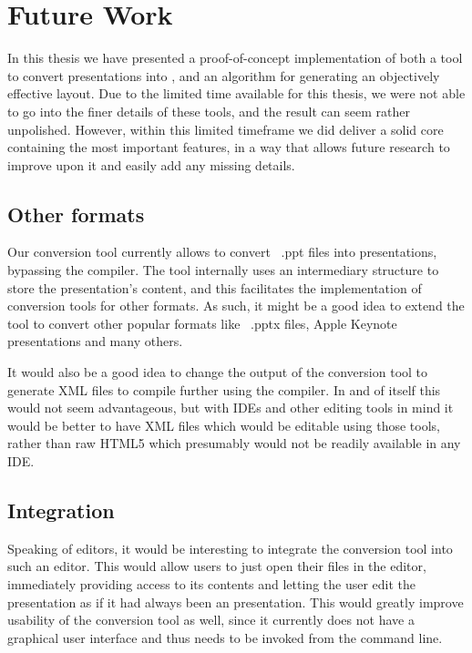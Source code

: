   \section{Future Work}
   \label{future}

   In this thesis we have presented a proof-of-concept implementation of both a
   tool to convert \ppt presentations into \mxp, and an algorithm for
   generating an objectively effective layout. Due to the limited time
   available for this thesis, we were not able to go into the finer details of
   these tools, and the result can seem rather unpolished. However, within this
   limited timeframe we did deliver a solid core containing the most important
   features, in a way that allows future research to improve upon it and easily
   add any missing details.

   \subsection{Other formats}

    Our conversion tool currently allows to convert \ppt\ .ppt files into \mxp
    presentations, bypassing the \mxp compiler. The tool internally uses an
    intermediary structure to store the presentation's content, and this
    facilitates the implementation of conversion tools for other formats. As
    such, it might be a good idea to extend the tool to convert other popular
    formats like \ppt\ .pptx files, Apple Keynote presentations and many others.

    It would also be a good idea to change the output of the conversion tool to
    generate \mxp XML files to compile further using the \mxp compiler. In and
    of itself this would not seem advantageous, but with \mxp IDEs and other
    editing tools in mind it would be better to have XML files which would be
    editable using those tools, rather than raw HTML5 which presumably would
    not be readily available in any IDE.

   \subsection{Integration}

    Speaking of editors, it would be interesting to integrate the conversion
    tool into such an editor. This would allow \mxp users to just open their
    \ppt files in the \mxp editor, immediately providing access to its contents
    and letting the user edit the presentation as if it had always been an \mxp
    presentation. This would greatly improve usability of the conversion tool
    as well, since it currently does not have a graphical user interface and
    thus needs to be invoked from the command line.

